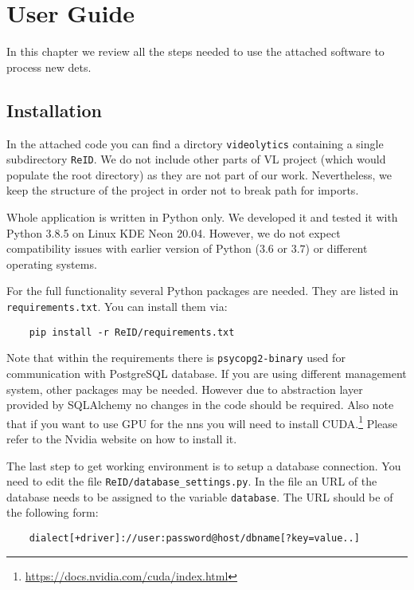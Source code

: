 \chapter{User Guide}

\label{ch:guide}

In this chapter we review all the steps needed to use the attached software to process new \glspl{det}.

\section{Installation}

In the attached code you can find a dirctory \texttt{videolytics} containing a single subdirectory \texttt{ReID}. We do not include other parts of \gls{VL} project (which would populate the root directory) as they are not part of our work. Nevertheless, we keep the structure of the project in order not to break path for imports.

Whole application is written in Python only. We developed it and tested it with Python 3.8.5 on Linux KDE Neon 20.04. However, we do not expect compatibility issues with earlier version of Python ($3.6$ or $3.7$) or different operating systems.

For the full functionality several Python packages are needed. They are listed in \texttt{requirements.txt}. You can install them via:

\begin{verbatim}
    pip install -r ReID/requirements.txt
\end{verbatim}

Note that within the requirements there is \verb+psycopg2-binary+ used for communication with PostgreSQL database. If you are using different management system, other packages may be needed. However due to abstraction layer provided by SQLAlchemy no changes in the code should be required. Also note that if you want to use GPU for the \glspl{nn} you will need to install CUDA.\footnote{\url{https://docs.nvidia.com/cuda/index.html}} Please refer to the Nvidia website on how to install it.

The last step to get working environment is to setup a database connection. You need to edit the file \texttt{ReID/database\_settings.py}. In the file an URL of the database needs to be assigned to the variable \verb+database+. The URL should be of the following form:

\begin{verbatim}
    dialect[+driver]://user:password@host/dbname[?key=value..]
\end{verbatim}

